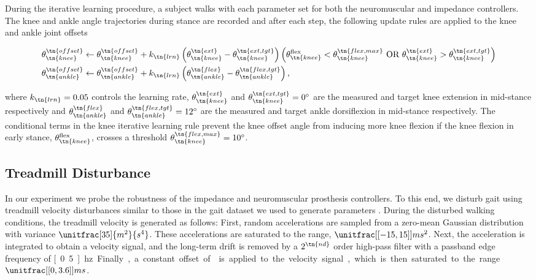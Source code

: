 During the iterative learning procedure, a subject walks with each parameter set
for both the neuromuscular and impedance controllers. The knee and ankle angle
trajectories during stance are recorded and after each step, the following
update rules are applied to the knee and ankle joint offsets
\begin{fullwidth}
\begin{align}
    \theta_\tn{knee}^\tn{offset} &\leftarrow \theta_\tn{knee}^\tn{offset} +
    k_\tn{lrn} \left(\theta_\tn{knee}^\tn{ext} - \theta_\tn{knee}^\tn{ext,tgt} \right)
    \left(\theta_\tn{knee}^\textrm{flex} < \theta_\tn{knee}^\tn{flex,max}
    \textrm{~OR~} \theta_\tn{knee}^\tn{ext} > \theta_\tn{knee}^\tn{ext,tgt}\right)\\
    \theta_\tn{ankle}^\tn{offset} &\leftarrow \theta_\tn{ankle}^\tn{offset} +
    k_\tn{lrn} \left(\theta_\tn{ankle}^\tn{flex} - \theta_\tn{ankle}^\tn{flex,tgt} \right),
\end{align}
\end{fullwidth}
where $k_\tn{lrn} = 0.05$ controls the learning rate,
$\theta_\tn{knee}^\tn{ext}$ and $\theta_\tn{knee}^\tn{ext,tgt} = 0^\circ$ are
the measured and target knee extension in mid-stance respectively and
$\theta_\tn{ankle}^\tn{flex}$ and $\theta_\tn{ankle}^\tn{flex,tgt} = 12^\circ$
are the measured and target ankle dorsiflexion in mid-stance respectively. The
conditional terms in the knee iterative learning rule prevent the knee offset
angle from inducing more knee flexion if the knee flexion in early stance,
$\theta_\tn{knee}^\textrm{flex}$, crosses a threshold
$\theta_\tn{knee}^\tn{flex,max} = 10^\circ$.

\subsection{Treadmill Disturbance}\label{sec:treadmill_exp_disturbance}
In our experiment we probe the robustness of the impedance and neuromuscular
prosthesis controllers. To this end, we disturb gait using treadmill velocity
disturbances similar to those in the gait dataset we used to generate parameters
\citep{moore2015elaborate}. During the disturbed walking conditions, the
treadmill velocity is generated as follows: First, random accelerations are
sampled from a zero-mean Gaussian distribution with variance
$\unitfrac[35]{m^2}{s^4}$. These accelerations are saturated to the range,
$\unitfrac[{[-15, 15]}]{m}{s^2}$. Next, the acceleration is integrated to obtain
a velocity signal, and the long-term drift is removed by a $2^\tn{nd}$ order
high-pass filter with a passband edge frequency of \unit[0.5]{hz}. Finally, a
constant offset of  is applied to the velocity signal, which
is then saturated to the range $\unitfrac[{[0, 3.6]}]{m}{s}$.

